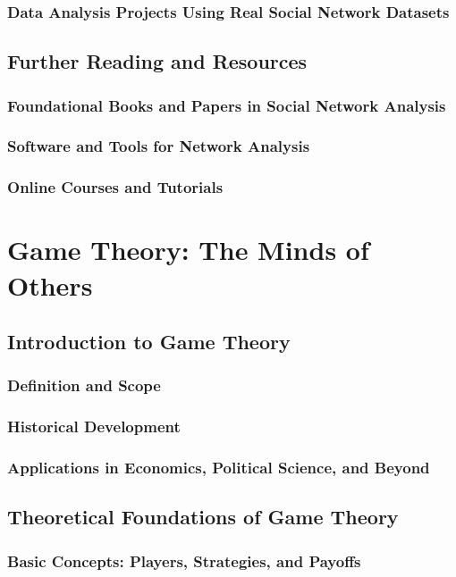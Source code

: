 \documentclass[12pt]{book} %
\begin{document}
\subsection{Data Analysis Projects Using Real Social Network Datasets}

\section{Further Reading and Resources}
\subsection{Foundational Books and Papers in Social Network Analysis}
\subsection{Software and Tools for Network Analysis}
\subsection{Online Courses and Tutorials}



\chapter{Game Theory: The Minds of Others}

\section{Introduction to Game Theory}
\subsection{Definition and Scope}
\subsection{Historical Development}
\subsection{Applications in Economics, Political Science, and Beyond}

\section{Theoretical Foundations of Game Theory}
\subsection{Basic Concepts: Players, Strategies, and Payoffs}
\end{document}
